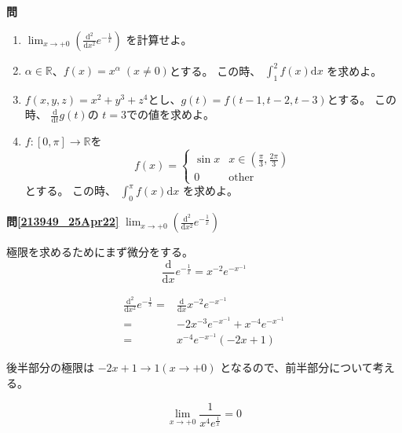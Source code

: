 \documentclass[12pt,b5paper]{ltjsarticle}
\begin{document}
\textbf{問}

\begin{enumerate}
 \item $\displaystyle
       \lim_{x\rightarrow +0}\left( \frac{\mathrm{d}^2}{\mathrm{d}x^2}e^{-\frac{1}{x}}\right)$
       を計算せよ。
       \label{213949_25Apr22}
 \item $\alpha \in \mathbb{R}$、$f(x)=x^\alpha \; (x\ne 0)$とする。
       この時、
       $\displaystyle \int_1^2 f(x) \mathrm{d}x$
       を求めよ。
       \label{214119_25Apr22}
 \item $f(x,y,z) = x^2+y^3+z^4$とし、$g(t)=f(t-1,t-2,t-3)$とする。
       この時、
       $\displaystyle \frac{\mathrm{d}}{\mathrm{d}t}g(t)$の
       $t=3$での値を求めよ。
       \label{214131_25Apr22}
 \item $f: [0,\pi] \rightarrow \mathbb{R}$を
       \label{214140_25Apr22}
       \begin{equation*}
        f(x) =
         \begin{cases}
          \sin x & x\in \left(\frac{\pi}{3},\frac{2\pi}{3}\right)\\
          0 & \text{other}
         \end{cases}
       \end{equation*}
       とする。
       この時、
       $\displaystyle \int_0^{\pi} f(x) \mathrm{d}x$
       を求めよ。
\end{enumerate}

\hrulefill

\textbf{問\ref{213949_25Apr22}}
$
\lim_{x\rightarrow +0}\left( \frac{\mathrm{d}^2}{\mathrm{d}x^2}e^{-\frac{1}{x}}\right)
$

極限を求めるためにまず微分をする。
\begin{equation}
 \frac{\mathrm{d}}{\mathrm{d}x}e^{-\frac{1}{x}} = x^{-2}e^{-x^{-1}}
\end{equation}

\begin{align}
 \frac{\mathrm{d}^2}{\mathrm{d}x^2}e^{-\frac{1}{x}}
  =& \frac{\mathrm{d}}{\mathrm{d}x} x^{-2}e^{-x^{-1}}\\
  =& -2x^{-3}e^{-x^{-1}} + x^{-4}e^{-x^{-1}}\\
  =& x^{-4}e^{-x^{-1}} (  -2x + 1 )
\end{align}

後半部分の極限は
$  -2x + 1 \rightarrow 1 (x\rightarrow +0)$
となるので、前半部分について考える。

\begin{equation}
 \lim_{x\rightarrow +0}\frac{1}{x^4e^{\frac{1}{x}}} = 0
\end{equation}
\end{document}
